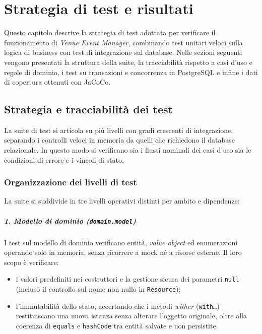 \chapter{Strategia di test e risultati}
\label{cap:test}

Questo capitolo descrive la strategia di test adottata per verificare il funzionamento di \textit{Venue Event Manager}, combinando test unitari veloci sulla logica di business con test di integrazione sul database.
Nelle sezioni seguenti vengono presentati la struttura della suite, la tracciabilità rispetto a casi d'uso e regole di dominio, i test su transazioni e concorrenza in PostgreSQL e infine i dati di copertura ottenuti con JaCoCo.

\section{Strategia e tracciabilità dei test}
\label{sec:strategia-test}

La suite di test si articola su più livelli con gradi crescenti di integrazione, separando i controlli veloci in memoria da quelli che richiedono il database relazionale. In questo modo si verificano sia i flussi nominali dei casi d'uso sia le condizioni di errore e i vincoli di stato.

\subsection{Organizzazione dei livelli di test}
\label{sec:livelli-isolamento}

La suite si suddivide in tre livelli operativi distinti per ambito e dipendenze:

\paragraph{1. Modello di dominio (\texttt{domain.model})}
I test sul modello di dominio verificano entità, \textit{value object} ed enumerazioni operando solo in memoria, senza ricorrere a mock né a risorse esterne. Il loro scopo è verificare:
\begin{itemize}
    \item i valori predefiniti nei costruttori e la gestione sicura dei parametri \texttt{null} (incluso il controllo sul nome non nullo in \texttt{Resource});
    \item l'immutabilità dello stato, accertando che i metodi \textit{wither} (\texttt{with\dots}) restituiscano una nuova istanza senza alterare l'oggetto originale, oltre alla coerenza di \texttt{equals} e \texttt{hashCode} tra entità salvate e non persistite.
\end{itemize}

